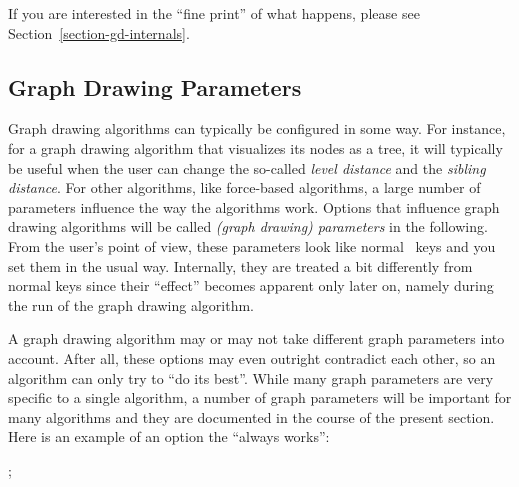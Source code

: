 If you are interested in the ``fine print'' of what happens, please
see Section~\ref{section-gd-internals}.


\subsection{Graph Drawing Parameters}

Graph drawing algorithms can typically be configured in some way. For
instance, for a graph drawing algorithm that visualizes its nodes as a
tree, it will typically be useful when the user can change the
so-called \emph{level distance} and the \emph{sibling distance}. For
other algorithms, like force-based algorithms, a large number of
parameters influence the way the algorithms work.
Options that influence graph drawing algorithms will be called
\emph{(graph drawing) parameters} in the following. From the user's
point of view, these parameters look like normal \tikzname\ keys and
you set them in the usual way. Internally, they are treated a bit
differently from normal keys since their ``effect'' becomes apparent
only later on, namely during the run of the graph drawing algorithm.

A graph drawing algorithm may or may not take different graph 
parameters into account. After all, these options may even outright
contradict each other, so an algorithm can only try to ``do its
best''. While many graph parameters are very specific to a single
algorithm, a number of graph parameters will be important for many
algorithms and they are documented in the course of the present
section. Here is an example of an option the ``always works'':

\begin{codeexample}[]
\tikz {};  
\end{codeexample}








